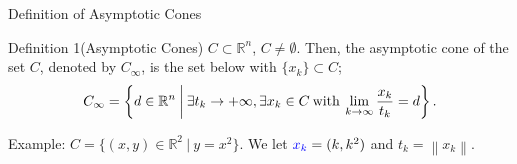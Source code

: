 \documentclass[aspectratio=169, dvipdfmx, 11pt]{beamer} %
\begin{document}
\begin{frame}{Definition of Asymptotic Cones}
  \begin{block}{Definition 1(Asymptotic Cones)}
    $C \subset \mathbb{R}^n$, $C \neq \emptyset$. Then, the asymptotic cone of the set $C$, denoted by $C_\infty$, is the set below with $\{ x_k \} \subset C$;
    \begin{equation}
      C_\infty = \left\{ d \in
      \mathbb{R}^n \:\middle|\: \exists t_k \rightarrow +\infty, \exists x_k \in C \:\text{with}\: \lim_{k \to \infty} \frac{x_k}{t_k} = d \right\}. \notag
    \end{equation}
  \end{block}

  Example: $C = \{(x,y) \in \mathbb{R}^2 \:|\: y=x^2\}$. We let $\textcolor{blue}{x_k} = (k, k^2)$ and $t_k = \left\lVert x_k \right\rVert$.


\end{frame}
\end{document}

